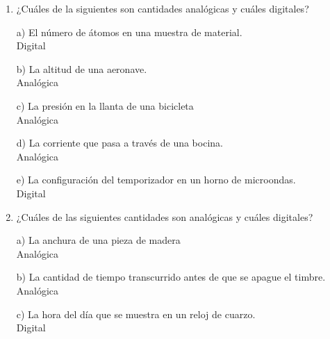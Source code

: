 \documentclass[a4paper, 12pt]{article}
\newcommand{\Aspace}{0.2cm}
\begin{document}
    \begin{enumerate}
        \item ¿Cuáles de la siguientes son cantidades analógicas y cuáles digitales? \par
            \vspace{\Aspace} \par
            a) El número de átomos en una muestra de material.
            \\ { \color{azul} Digital }

            \vspace{\Aspace} \par
            b) La altitud de una aeronave.
            \\ { \color{azul} Analógica }

            \vspace{\Aspace} \par
            c) La presión en la llanta de una bicicleta
            \\ { \color{azul} Analógica }

            \vspace{\Aspace} \par
            d) La corriente que pasa a través de una bocina.
            \\ { \color{azul} Analógica }

            \vspace{\Aspace} \par
            e) La configuración del temporizador en un horno de microondas.
            \\ { \color{azul} Digital }


        \item ¿Cuáles de las siguientes cantidades son analógicas y cuáles digitales? \par          
            \vspace{\Aspace} \par
            a) La anchura de una pieza de madera
            \\ { \color{azul} Analógica }

            \vspace{\Aspace} \par
            b) La cantidad de tiempo transcurrido antes de que se apague el timbre.
            \\ { \color{azul} Analógica }

            \vspace{\Aspace} \par
            c) La hora del día que se muestra en un reloj de cuarzo.
            \\ { \color{azul} Digital }


\end{enumerate}
\end{document}
